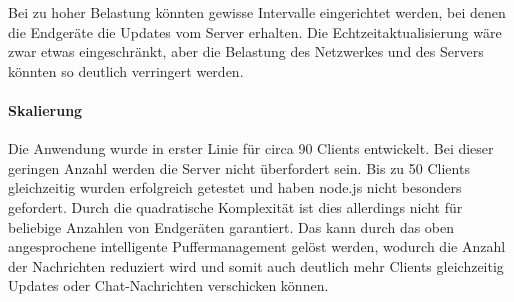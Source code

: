 Bei zu hoher Belastung könnten gewisse Intervalle eingerichtet werden, bei denen die Endgeräte die Updates vom Server erhalten. Die Echtzeitaktualisierung wäre zwar etwas eingeschränkt, aber die Belastung des Netzwerkes und des Servers könnten so deutlich verringert werden.

\paragraph{Skalierung}
Die Anwendung wurde in erster Linie für circa 90 Clients entwickelt. Bei dieser geringen Anzahl werden die Server nicht überfordert sein. Bis zu 50 Clients gleichzeitig wurden erfolgreich getestet und haben node.js nicht besonders gefordert. Durch die quadratische Komplexität ist dies allerdings nicht für beliebige Anzahlen von Endgeräten garantiert. Das kann durch das oben angesprochene intelligente Puffermanagement gelöst werden, wodurch die Anzahl der Nachrichten reduziert wird und somit auch deutlich mehr Clients gleichzeitig Updates oder Chat-Nachrichten verschicken können.








